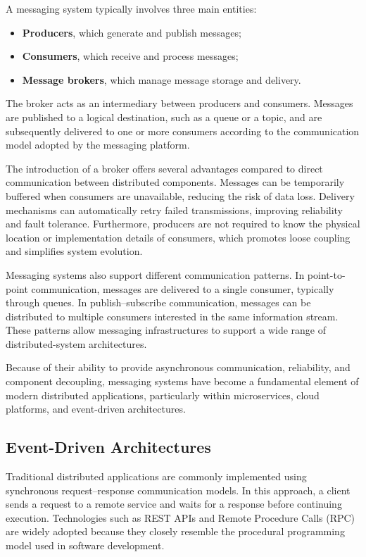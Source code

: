 \documentclass{scrartcl}
\begin{document}
A messaging system typically involves three main entities:

\begin{itemize}
\item \textbf{Producers}, which generate and publish messages;
\item \textbf{Consumers}, which receive and process messages;
\item \textbf{Message brokers}, which manage message storage and delivery.
\end{itemize}

The broker acts as an intermediary between producers and consumers. Messages are published to a logical destination, such as a queue or a topic, and are subsequently delivered to one or more consumers according to the communication model adopted by the messaging platform.

The introduction of a broker offers several advantages compared to direct communication between distributed components. Messages can be temporarily buffered when consumers are unavailable, reducing the risk of data loss. Delivery mechanisms can automatically retry failed transmissions, improving reliability and fault tolerance. Furthermore, producers are not required to know the physical location or implementation details of consumers, which promotes loose coupling and simplifies system evolution.

Messaging systems also support different communication patterns. In point-to-point communication, messages are delivered to a single consumer, typically through queues. In publish--subscribe communication, messages can be distributed to multiple consumers interested in the same information stream. These patterns allow messaging infrastructures to support a wide range of distributed-system architectures.

Because of their ability to provide asynchronous communication, reliability, and component decoupling, messaging systems have become a fundamental element of modern distributed applications, particularly within microservices, cloud platforms, and event-driven architectures.

\subsection{Event-Driven Architectures}

Traditional distributed applications are commonly implemented using synchronous request--response communication models. In this approach, a client sends a request to a remote service and waits for a response before continuing execution. Technologies such as REST APIs and Remote Procedure Calls (RPC) are widely adopted because they closely resemble the procedural programming model used in software development.
\end{document}
